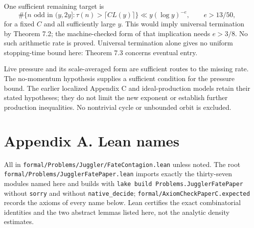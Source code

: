 \documentclass[11pt,a4paper]{article}
\begin{document}
One sufficient remaining target is \[
\#\{n\text{ odd in }(y,2y]:\tau(n)>\lceil CL(y)\rceil\}
 \ll y(\log y)^{-e},\qquad e>13/50,
\] for a fixed \(C\) and all sufficiently large \(y\). This would imply
universal termination by Theorem 7.2; the machine-checked form of that
implication needs \(e>3/8\). No such arithmetic rate is proved.
Universal termination alone gives no uniform stopping-time bound here:
Theorem 7.3 concerns eventual entry.

Live pressure and its scale-averaged form are sufficient routes to the
missing rate. The no-momentum hypothesis supplies a sufficient condition
for the pressure bound. The earlier localized Appendix C and
ideal-production models retain their stated hypotheses; they do not
limit the new exponent or establish further production inequalities. No
nontrivial cycle or unbounded orbit is excluded.

\section{Appendix A. Lean names}\label{appendix-a.-lean-names}

All in \texttt{\nolinkurl{formal/Problems/Juggler/FateContagion.lean}}
unless noted. The root
\texttt{\nolinkurl{formal/Problems/JugglerFatePaper.lean}} imports
exactly the thirty-seven modules named here and builds with
\texttt{lake\ build\ Problems.JugglerFatePaper} without
\texttt{\nolinkurl{sorry}} and without
\texttt{\nolinkurl{native_decide}};
\texttt{\nolinkurl{formal/AxiomCheckPaperC.expected}} records the axioms
of every name below. Lean certifies the exact combinatorial identities
and the two abstract lemmas listed here, not the analytic density
estimates.

\begingroup\small
\end{document}
